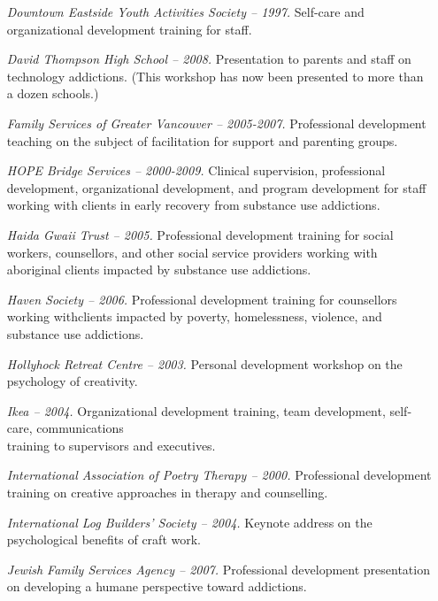 \documentclass[10pt,DIV09,letterpaper,oneside,headsepline]{scrreprt}
\begin{document}
\begin{itemize}
\item [\textit{Downtown Eastside Youth Activities Society -- 1997.}]
Self-care and organizational development training for staff.

\item [\textit{David Thompson High School -- 2008.}]
Presentation to parents and staff on technology addictions. (This workshop has now been presented to more than a dozen schools.)

\item [\textit{Family Services of Greater Vancouver -- 2005-2007.}]
Professional development teaching on the subject of facilitation for support and parenting groups.

\item [\textit{HOPE Bridge Services -- 2000-2009.}]
Clinical supervision, professional development, organizational development, and program development for staff working with clients in early recovery from substance use addictions.

\item [\textit{Haida Gwaii Trust -- 2005.}]
Professional development training for social workers, counsellors, and other social service providers working with aboriginal clients impacted by substance use addictions.

\item [\textit{Haven Society -- 2006.}]
Professional development training for counsellors working withclients impacted by poverty, homelessness, violence, and substance use addictions.

\item [\textit{Hollyhock Retreat Centre -- 2003.}]
Personal development workshop on the psychology of creativity.

\item [\textit{Ikea -- 2004.}]
Organizational development training, team development, self-care, communications\\ training to supervisors and executives.

\item [\textit{International Association of Poetry Therapy -- 2000.}]
Professional development training on creative approaches in therapy and counselling.

\item [\textit{International Log Builders' Society -- 2004.}]
Keynote address on the psychological benefits of craft work.

\item [\textit{Jewish Family Services Agency -- 2007.}]
Professional development presentation on developing a humane perspective toward addictions.


\end{itemize}
\end{document}
